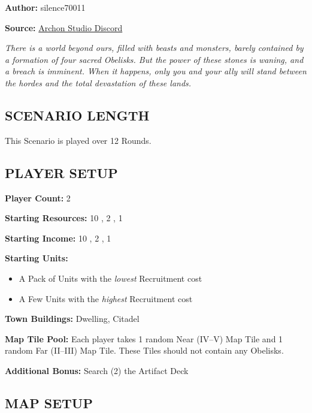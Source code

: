 
\begin{multicols}{2}

\textbf{Author:} silence70011

\textbf{Source:} \href{https://discord.com/channels/740870068178649108/1233112440322002964/1233112440322002964}{Archon Studio Discord}

\textit{There is a world beyond ours, filled with beasts and monsters, barely contained by a formation of four sacred Obelisks.
  But the power of these stones is waning, and a breach is imminent.
  When it happens, only you and your ally will stand between the hordes and the total devastation of these lands.
}

\subsection*{\MakeUppercase{Scenario Length}}

This Scenario is played over 12 Rounds.

\subsection*{\MakeUppercase{Player Setup}}

\textbf{Player Count:} 2

\textbf{Starting Resources:} 10 , 2 , 1 

\textbf{Starting Income:} 10 , 2 , 1 

\textbf{Starting Units:}
\begin{itemize}
  \item A Pack of  Units with the \textit{lowest} Recruitment cost
  \item A Few  Units with the \textit{highest} Recruitment cost
\end{itemize}

\textbf{Town Buildings:}  Dwelling, Citadel

\textbf{Map Tile Pool:} Each player takes 1 random Near (IV--V) Map Tile and 1 random Far (II--III) Map Tile. These Tiles should not contain any Obelisks.

\textbf{Additional Bonus:} Search (2) the Artifact Deck

\subsection*{\MakeUppercase{Map Setup}}


\end{multicols}
